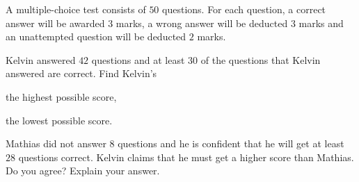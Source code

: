  A multiple-choice test consists of $50$ questions. For each question, a correct answer will be awarded $3$ marks, a wrong answer will be deducted $3$ marks and an unattempted question will be deducted $2$ marks.

\begin{subparts}
  \item Kelvin answered $42$ questions and at least $30$ of the questions that Kelvin answered are correct. Find Kelvin's
  \begin{subpartsii}
    \item the highest possible score,
    \item the lowest possible score.
  \end{subpartsii}
  \item Mathias did not answer $8$ questions and he is confident that he will get at least $28$ questions correct. Kelvin claims that he must get a higher score than Mathias. Do you agree? Explain your answer.
\end{subparts}

